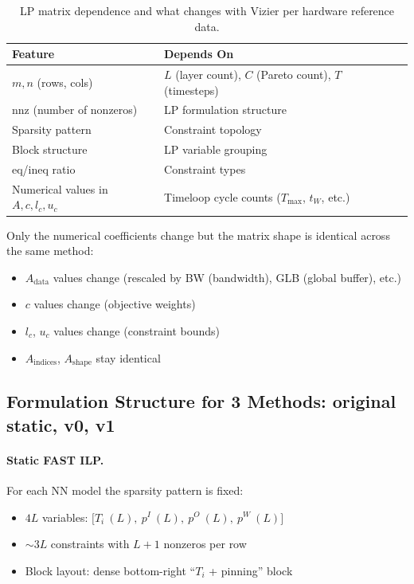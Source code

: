 \documentclass{article}
\begin{document}
\begin{table}[h]
\centering
\begin{tabular}{lll}
\toprule
\textbf{Feature} & \textbf{Depends On} \\
\midrule
$m, n$ (rows, cols) & $L$ (layer count), $C$ (Pareto count), $T$ (timesteps) \\
$\text{nnz}$ (number of nonzeros) & LP formulation structure \\
Sparsity pattern & Constraint topology \\
Block structure & LP variable grouping \\
eq/ineq ratio & Constraint types \\
Numerical values in $A, c, l_c, u_c$ & Timeloop cycle counts ($T_{\max}$, $t_W$, etc.)\\
\bottomrule
\end{tabular}
\caption{LP matrix dependence and what changes with Vizier per hardware reference data.}
\end{table}


Only the numerical coefficients change but the matrix shape is identical across the same method:
\begin{itemize}
    \item $A_{\text{data}}$ values change (rescaled by BW (bandwidth), GLB (global buffer), etc.)
    \item $c$ values change (objective weights)
    \item $l_c$, $u_c$ values change (constraint bounds)
    \item $A_{\text{indices}}$, $A_{\text{shape}}$ stay identical
\end{itemize}

\subsection{Formulation Structure for 3 Methods: original static, v0, v1}

\paragraph{Static FAST ILP.}
For each NN model the sparsity pattern is fixed:
\begin{itemize}
    \item $4L$ variables: $\bigl[T_i\ (L),\ p^I\ (L),\ p^O\ (L),\ p^W\ (L)\bigr]$
    \item ${\sim}3L$ constraints with $L{+}1$ nonzeros per row
    \item Block layout: dense bottom-right ``$T_i$ + pinning'' block
\end{itemize}
\end{document}
